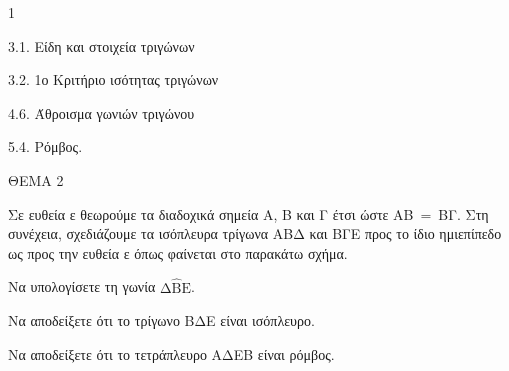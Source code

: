 \begin{ylh}{1}
    \item 3.1. Είδη και στοιχεία τριγώνων
    \item 3.2. 1ο Κριτήριο ισότητας τριγώνων
    \item 4.6. Άθροισμα γωνιών τριγώνου
    \item 5.4. Ρόμβος.
\end{ylh}

ΘΕΜΑ 2

Σε ευθεία ε θεωρούμε τα διαδοχικά σημεία Α, Β και Γ έτσι ώστε ΑΒ$\  = \ $ΒΓ. Στη συνέχεια, σχεδιάζουμε τα ισόπλευρα τρίγωνα ΑΒΔ και ΒΓΕ προς το ίδιο ημιεπίπεδο ως προς την ευθεία ε όπως φαίνεται στο παρακάτω σχήμα.

\begin{alist}
\item Να υπολογίσετε τη γωνία $\text{Δ}\widehat{\text{Β}}\text{Ε}$.


\item Να αποδείξετε ότι το τρίγωνο ΒΔΕ είναι ισόπλευρο.


\item Να αποδείξετε ότι το τετράπλευρο ΑΔΕΒ είναι ρόμβος.



\end{alist}
